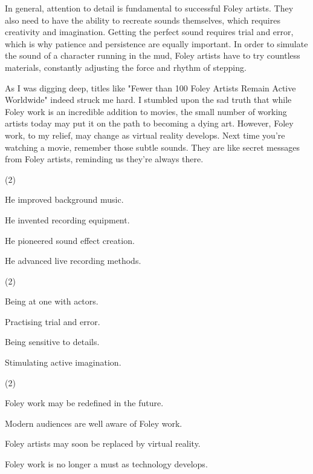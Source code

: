 \documentclass{英语试卷}
\begin{document}
\par In general, attention to detail is fundamental to successful Foley artists. They also need to have the ability to recreate sounds themselves, which requires creativity and imagination. Getting the perfect sound requires trial and error, which is why patience and persistence are equally important. In order to simulate the sound of a character running in the mud, Foley artists have to try countless materials, constantly adjusting the force and rhythm of stepping.\par
\par As I was digging deep, titles like "Fewer than 100 Foley Artists Remain Active Worldwide" indeed struck me hard. I stumbled upon the sad truth that while Foley work is an incredible addition to movies, the small number of working artists today may put it on the path to becoming a dying art. However, Foley work, to my relief, may change as virtual reality develops. Next time you're watching a movie, remember those subtle sounds. They are like secret messages from Foley artists, reminding us they're always there.\par
{}
\begin{choices}(2)
  \item He improved background music.
  \item He invented recording equipment.
  \item He pioneered sound effect creation.
  \item He advanced live recording methods.
\end{choices}
\begin{choices}(2)
  \item Being at one with actors.
  \item Practising trial and error.
  \item Being sensitive to details.
  \item Stimulating active imagination.
\end{choices}
\begin{choices}(2)
  \item Foley work may be redefined in the future.
  \item Modern audiences are well aware of Foley work.
  \item Foley artists may soon be replaced by virtual reality.
  \item Foley work is no longer a must as technology develops.
\end{choices}
\end{document}
